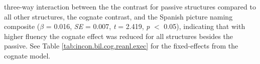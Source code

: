 three-way interaction between the the contrast for passive structures compared to all other structures, the cognate contrast, and the Spanish picture naming composite (\emph{$\beta$} = 0.016, \emph{SE} = 0.007, \emph{t} = 2.419, \emph{p} $<$ 0.05), indicating that with higher fluency the cognate effect was reduced for all structures besides the passive. See Table \ref{tab:incon.bil.cog.reanl.exec} for the fixed-effects from the cognate model.


